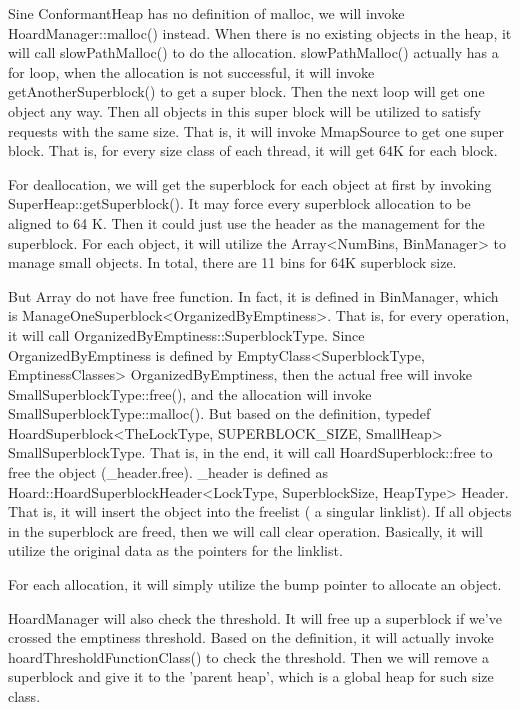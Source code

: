 Sine ConformantHeap has no definition of malloc, we will invoke HoardManager::malloc() instead. When there is no existing objects in the heap, it will call slowPathMalloc() to do the allocation. slowPathMalloc() actually has a for loop, when the allocation is not successful, it will invoke getAnotherSuperblock() to get a super block. Then the next loop will get one object any way. Then all objects in this super block will be utilized to satisfy requests with the same size. That is, it will invoke MmapSource to get one super block. That is, for every size class of each thread, it will get 64K for each block. 

For deallocation, we will get the superblock for each object at first by invoking SuperHeap::getSuperblock(). It may force every superblock allocation to be aligned to 64 K. Then it could just use the header as the management for the superblock. For each object, it will utilize the Array<NumBins, BinManager> to manage small objects.  In total, there are 11 bins for 64K superblock size. 

But Array do not have free function. In fact, it is defined in BinManager, which is ManageOneSuperblock<OrganizedByEmptiness>. That is, for every operation, it will call OrganizedByEmptiness::SuperblockType. Since OrganizedByEmptiness is defined by EmptyClass<SuperblockType, EmptinessClasses> OrganizedByEmptiness, then the actual free will invoke SmallSuperblockType::free(), and the allocation will invoke SmallSuperblockType::malloc(). But based on the definition, typedef HoardSuperblock<TheLockType, SUPERBLOCK\_SIZE, SmallHeap> SmallSuperblockType. That is, in the end, it will call  HoardSuperblock::free to free the object (\_header.free). \_header is defined as Hoard::HoardSuperblockHeader<LockType, SuperblockSize, HeapType> Header. That is, it will insert the object into the freelist ( a singular linklist). If all objects in the superblock are freed, then we will call clear operation. Basically, it will utilize the original data as the pointers for the linklist.  

For each allocation, it will simply utilize the bump pointer to allocate an object. 

HoardManager will also check the threshold. It will free up a superblock if we've crossed the emptiness threshold. Based on the definition, it will actually invoke hoardThresholdFunctionClass() to check the threshold. Then we will remove a superblock and give it to the 'parent heap', which is a global heap for such size class.  
     
